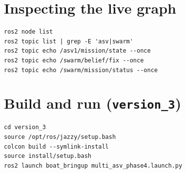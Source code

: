 \section{Inspecting the live graph}
\begin{verbatim}
ros2 node list
ros2 topic list | grep -E 'asv|swarm'
ros2 topic echo /asv1/mission/state --once
ros2 topic echo /swarm/belief/fix --once
ros2 topic echo /swarm/mission/status --once
\end{verbatim}

\section{Build and run (\texttt{version\_3})}
\begin{verbatim}
cd version_3
source /opt/ros/jazzy/setup.bash
colcon build --symlink-install
source install/setup.bash
ros2 launch boat_bringup multi_asv_phase4.launch.py
\end{verbatim}
